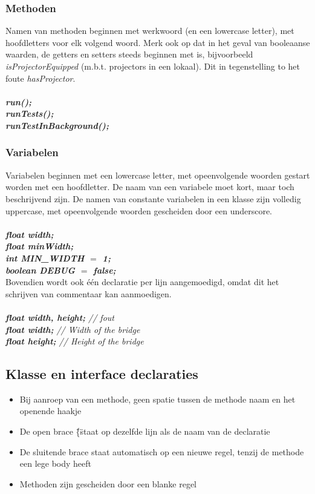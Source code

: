 	\subsubsection{Methoden}
		Namen van methoden beginnen met werkwoord (en een lowercase letter), met hoofdletters voor elk volgend woord.
		Merk ook op dat in het geval van booleaanse waarden, de getters en setters steeds beginnen met is, bijvoorbeeld \emph{isProjectorEquipped} (m.b.t. projectors in een lokaal). 
		Dit in tegenstelling to het foute \emph{hasProjector}.
		\\ \\
		\emph{\textbf{run();}} \\
		\emph{\textbf{runTests();}} \\
		\emph{\textbf{runTestInBackground();}}
		
	\subsubsection{Variabelen}
		Variabelen beginnen met een lowercase letter, met opeenvolgende woorden gestart worden met een hoofdletter. 
		De naam van een variabele moet kort, maar toch beschrijvend zijn. 
		De namen van constante variabelen in een klasse zijn volledig uppercase, met opeenvolgende woorden gescheiden door een underscore.
		\\ \\		
		\emph{\textbf{float width;}} \\
		\emph{\textbf{float minWidth;}} \\
		\emph{\textbf{int MIN\_WIDTH $=$ 1;}} \\
		\emph{\textbf{boolean DEBUG $=$ false;}} \\
		
		Bovendien wordt ook één declaratie per lijn aangemoedigd, omdat dit het schrijven van commentaar kan aanmoedigen.
		\\ \\
		\emph{\textbf{float width, height;} // fout} \\
		\emph{\textbf{float width;} // Width of the bridge} \\
		\emph{\textbf{float height;} // Height of the bridge}
		

\subsection{Klasse en interface declaraties}
	\begin{itemize}
		\item{Bij aanroep van een methode, geen spatie tussen de methode naam en het openende haakje}
		\item{De open brace \"\{\" staat op dezelfde lijn als de naam van de declaratie}
		\item{De sluitende brace staat automatisch op een nieuwe regel, tenzij de methode een lege body heeft}
		\item{Methoden zijn gescheiden door een blanke regel}
	\end{itemize}
